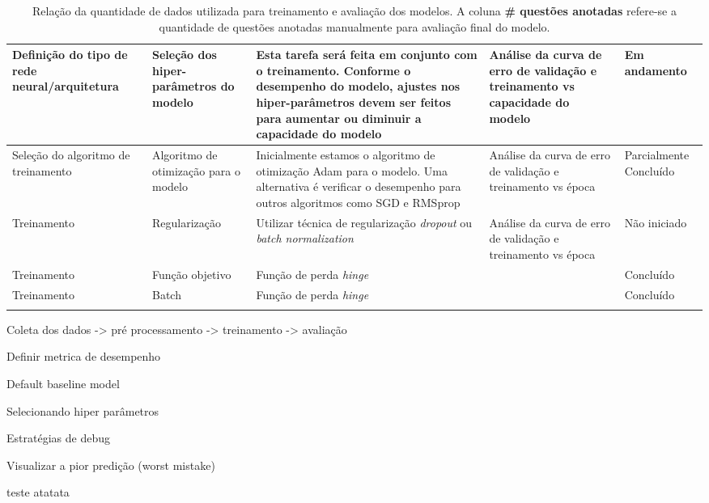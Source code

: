 {\begin{longtable}{ p{8em} p{8em} p{10em} p{8em} p{6em} }
Definição do tipo de rede neural/arquitetura & Seleção dos hiper-parâmetros do modelo & Esta tarefa será feita em conjunto com o treinamento. Conforme o desempenho do modelo, ajustes nos hiper-parâmetros devem ser feitos para aumentar ou diminuir a capacidade do modelo & Análise da curva de erro de validação e treinamento vs capacidade do modelo & Em andamento  \\
\hline

Seleção do algoritmo de treinamento & Algoritmo de otimização para o modelo & Inicialmente estamos o algoritmo de otimização Adam para o modelo. Uma alternativa é verificar o desempenho para outros algoritmos como SGD e RMSprop & Análise da curva de erro de validação e treinamento vs época & Parcialmente Concluído  \\
\hline

Treinamento & Regularização & Utilizar técnica de regularização \textit{dropout} ou \textit{batch normalization} & Análise da curva de erro de validação e treinamento vs época & Não iniciado  \\
\hline

Treinamento & Função objetivo & Função de perda \textit{hinge} &  & Concluído  \\
\hline

Treinamento & Batch & Função de perda \textit{hinge} &  & Concluído  \\
\hline



 
\caption{Relação da quantidade de dados utilizada para treinamento e avaliação dos modelos. A coluna \textbf{\# questões anotadas} refere-se a quantidade de questões anotadas manualmente para avaliação final do modelo.}
\label{table:etapas-processo-treinamento}
\end{longtable}}




Coleta dos dados -> pré processamento -> treinamento -> avaliação 



Definir metrica de desempenho

Default baseline model

Selecionando hiper parâmetros

Estratégias de debug

Visualizar a pior predição (worst mistake)


teste
atatata













